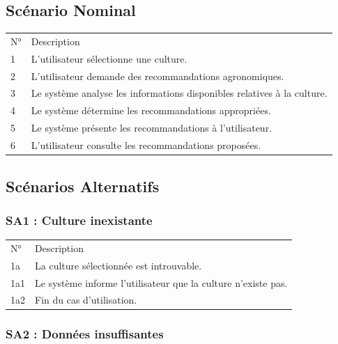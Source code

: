 \documentclass[
]{book}
\begin{document}
\hypertarget{scuxe9nario-nominal-4}{%
\subsection{Scénario Nominal}\label{scuxe9nario-nominal-4}}

\begin{longtable}[]{@{}ll@{}}
\toprule
\endhead
N° & Description \\
1 & L'utilisateur sélectionne une culture. \\
2 & L'utilisateur demande des recommandations agronomiques. \\
3 & Le système analyse les informations disponibles relatives à la
culture. \\
4 & Le système détermine les recommandations appropriées. \\
5 & Le système présente les recommandations à l'utilisateur. \\
6 & L'utilisateur consulte les recommandations proposées. \\
\bottomrule
\end{longtable}

\hypertarget{scuxe9narios-alternatifs-4}{%
\subsection{Scénarios Alternatifs}\label{scuxe9narios-alternatifs-4}}

\hypertarget{sa1-culture-inexistante-2}{%
\subsubsection{SA1 : Culture
inexistante}\label{sa1-culture-inexistante-2}}

\begin{longtable}[]{@{}ll@{}}
\toprule
\endhead
N° & Description \\
1a & La culture sélectionnée est introuvable. \\
1a1 & Le système informe l'utilisateur que la culture n'existe pas. \\
1a2 & Fin du cas d'utilisation. \\
\bottomrule
\end{longtable}

\hypertarget{sa2-donnuxe9es-insuffisantes}{%
\subsubsection{SA2 : Données
insuffisantes}\label{sa2-donnuxe9es-insuffisantes}}
\end{document}
